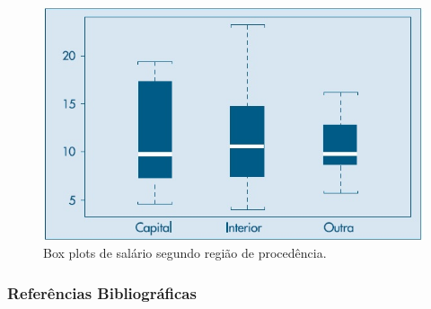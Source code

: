 \documentclass[14pt,aspectratio=1610]{beamer}
\begin{document}
\begin{frame}{}
\frametitle{}
\begin{figure}[H]
    \centering
    \includegraphics[scale=0.5]{Figuras/boxplot2}
    \caption{Box plots de salário segundo região de procedência. \cite{Morettin09}}
  \end{figure}
\end{frame}

\begin{frame}{}
\frametitle{Referências Bibliográficas}

\end{frame}
\end{document}
